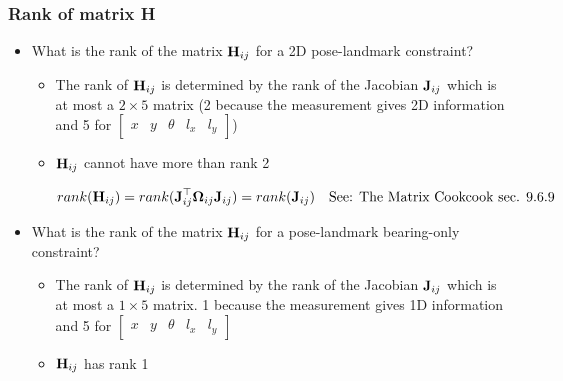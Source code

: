 \begin{frame}
    \frametitle{Rank of matrix H}
    
    \begin{itemize}
    \item What is the rank of the matrix $\boldsymbol{\mathbf{H}}_{ij}$ for a 2D pose-landmark constraint?
    \begin{itemize}
    \item The rank of $\boldsymbol{\mathbf{H}}_{ij}$ is determined by the rank of the Jacobian $\boldsymbol{\mathbf{J}}_{ij}$ which is at most a $2 \times 5$ matrix (2 because the measurement gives 2D information and 5 for $\begin{bmatrix} x & y & \theta & l_{x} & l_{y} \end{bmatrix}$)
    \item $\boldsymbol{\mathbf{H}}_{ij}$ cannot have more than rank 2
    
    $rank(\boldsymbol{\mathbf{H}}_{ij}) = rank(\boldsymbol{\mathbf{J}}_{ij}^{\top} \boldsymbol{\mathbf{\Omega}}_{ij} \boldsymbol{\mathbf{J}}_{ij}) = rank(\boldsymbol{\mathbf{J}}_{ij}) \quad \text{See: The Matrix Cookcook sec. 9.6.9}$
    \end{itemize}
    
    \item What is the rank of the matrix $\boldsymbol{\mathbf{H}}_{ij}$ for a pose-landmark bearing-only constraint?
    \begin{itemize}
    \item The rank of $\boldsymbol{\mathbf{H}}_{ij}$ is determined by the rank of the Jacobian $\boldsymbol{\mathbf{J}}_{ij}$ which is at most a $1 \times 5$ matrix. 1 because the measurement gives 1D information and 5 for $\begin{bmatrix} x & y & \theta & l_{x} & l_{y} \end{bmatrix}$
    \item $\boldsymbol{\mathbf{H}}_{ij}$ has rank 1
    \end{itemize}
    
    \end{itemize}
    \end{frame}
    
